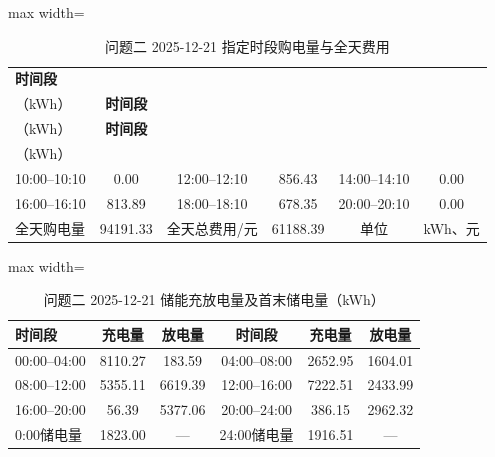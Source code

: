 \documentclass[UTF8,a4paper,zihao=-4,fontset=windows]{ctexart}
\begin{document}
\begin{table}[H]\centering
\fontsize{9.5}{12}\selectfont\setlength{\tabcolsep}{4pt}\renewcommand{\arraystretch}{1.12}
\begin{adjustbox}{max width=\linewidth}\begin{tabular}{lccccc}\toprule
\textbf{时间段} & \shortstack{\textbf{购电量}\\{\normalfont （kWh）}} & \textbf{时间段} & \shortstack{\textbf{购电量}\\{\normalfont （kWh）}} & \textbf{时间段} & \shortstack{\textbf{购电量}\\{\normalfont （kWh）}}\\\midrule
10:00–10:10 & 0.00 & 12:00–12:10 & 856.43 & 14:00–14:10 & 0.00\\
16:00–16:10 & 813.89 & 18:00–18:10 & 678.35 & 20:00–20:10 & 0.00\\
全天购电量 & 94191.33 & 全天总费用/元 & 61188.39 & 单位 & kWh、元\\
\bottomrule\end{tabular}\end{adjustbox}
\caption{问题二 2025-12-21 指定时段购电量与全天费用}
\end{table}
\begin{table}[H]\centering
\fontsize{9.5}{12}\selectfont\setlength{\tabcolsep}{4pt}\renewcommand{\arraystretch}{1.12}
\begin{adjustbox}{max width=\linewidth}\begin{tabular}{lccccc}\toprule
\textbf{时间段} & \textbf{充电量} & \textbf{放电量} & \textbf{时间段} & \textbf{充电量} & \textbf{放电量}\\\midrule
00:00–04:00 & 8110.27 & 183.59 & 04:00–08:00 & 2652.95 & 1604.01\\
08:00–12:00 & 5355.11 & 6619.39 & 12:00–16:00 & 7222.51 & 2433.99\\
16:00–20:00 & 56.39 & 5377.06 & 20:00–24:00 & 386.15 & 2962.32\\
0:00储电量 & 1823.00 & — & 24:00储电量 & 1916.51 & —\\
\bottomrule\end{tabular}\end{adjustbox}
\caption{问题二 2025-12-21 储能充放电量及首末储电量（kWh）}
\end{table}
\end{document}
